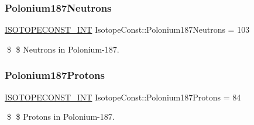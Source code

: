 \subsubsection{\texorpdfstring{Polonium187\+Neutrons}{Polonium187Neutrons}}
{\footnotesize\ttfamily \mbox{\hyperlink{group___isotope_const-_macros_ga5f18360b3e99483a35c32d789e62621c}{I\+S\+O\+T\+O\+P\+E\+C\+O\+N\+S\+T\+\_\+\+I\+NT}} Isotope\+Const\+::\+Polonium187\+Neutrons = 103}

\$ \$ Neutrons in Polonium-\/187. \mbox{\label{group___isotope_const-_polonium-_po187_ga9eb452b99b37a0f4e46446e99a27e94a}} 
\subsubsection{\texorpdfstring{Polonium187\+Protons}{Polonium187Protons}}
{\footnotesize\ttfamily \mbox{\hyperlink{group___isotope_const-_macros_ga5f18360b3e99483a35c32d789e62621c}{I\+S\+O\+T\+O\+P\+E\+C\+O\+N\+S\+T\+\_\+\+I\+NT}} Isotope\+Const\+::\+Polonium187\+Protons = 84}

\$ \$ Protons in Polonium-\/187. 